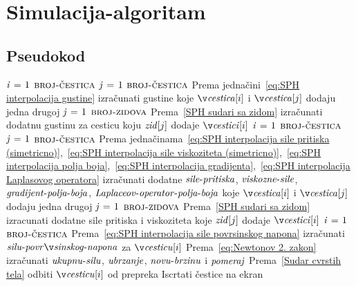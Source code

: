 \documentclass[12pt]{article}
\begin{document}
\section{Simulacija-algoritam}
    \subsection{Pseudokod}

\begin{codebox}
\li \While {} \Do
\li     \For $\id{i} \gets 1$ \To $\const{broj-\v cestica}$ \Do
\li         \For $\id{j} \gets 1$ \To $\const{broj-\v cestica}$ \Do
\li             \Comment Prema jedna\v cini~\eqref{eq:SPH interpolacija gustine}
\li             izra\v cunati gustine koje $\id{\v cestica}[i]$ i $\id{\v cestica}[j]$ dodaju jedna drugoj
            \End
\li         \For $\id{j} \gets 1$ \To $\textnormal{\scshape broj-zidova}$ \Do
\li             \Comment Prema~\ref{SPH sudari sa zidom}
\li             izra\v cunati dodatnu gustinu za cesticu koju $\id{zid}[j]$ dodaje $\id{\v cestici}[i]$
            \End
        \End
\li     \For $\id{i} \gets 1$ \To $\const{broj-\v cestica}$ \Do
\li         \For $\id{j} \gets 1$ \To $\const{broj-\v cestica}$ \Do
\li             \Comment Prema jedna\v cinama~\eqref{eq:SPH interpolacija sile pritiska (simetricno)},~\eqref{eq:SPH interpolacija sile viskoziteta (simetricno)},~\eqref{eq:SPH interpolacija polja boja},~\eqref{eq:SPH interpolacija gradijenta},~\eqref{eq:SPH interpolacija Laplasovog operatora}
\li             izra\v cunati dodatne $\id{sile-pritiska}$, $\id{viskozne-sile}$,
\zi             $\id{gradijent-polja-boja}$, $\id{Laplaceov-operator-polja-boja}$
\zi             koje $\id{\v cestica}[i]$ i $\id{\v cestica}[j]$ dodaju jedna drugoj
            \End
\li         \For $\id{j} \gets 1$ \To $\textnormal{\scshape broj-zidova}$ \Do
\li             \Comment Prema~\ref{SPH sudari sa zidom}
\li             izracunati dodatne sile pritiska i viskoziteta
\zi             koje $\id{zid}[j]$ dodaje $\id{\v cestici}[i]$
            \End
        \End
\li     \For $\id{i} \gets 1$ \To $\const{broj-\v cestica}$ \Do
\li          \Comment Prema~\eqref{eq:SPH interpolacija sile povrsinskog napona}
\li          izra\v cunati $\id{silu-povr\v sinskog-napona}$ za $\id{\v cesticu}[i]$
\li          \Comment Prema~\eqref{eq:Newtonov 2. zakon}
\li          izra\v cunati $\id{ukupnu-silu}$, $\id{ubrzanje}$, $\id{novu-brzinu}$ i $\id{pomeraj}$
\li          \Comment Prema~\ref{Sudar cvrstih tela}
\li          odbiti $\id{\v cesticu}[i]$ od prepreka
        \End
\li     Iscrtati \v cestice na ekran
   \End
\end{codebox}
\end{document}
